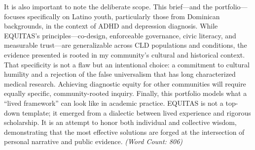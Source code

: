 \documentclass[11pt,twoside]{article}
\begin{document}
It is also important to note the deliberate scope. This brief—and the portfolio—focuses specifically on Latino youth, particularly those from Dominican backgrounds, in the context of ADHD and depression diagnosis. While EQUITAS’s principles—co-design, enforceable governance, civic literacy, and measurable trust—are generalizable across CLD populations and conditions, the evidence presented is rooted in my community’s cultural and historical context. That specificity is not a flaw but an intentional choice: a commitment to cultural humility and a rejection of the false universalism that has long characterized medical research. Achieving diagnostic equity for other communities will require equally specific, community-rooted inquiry. Finally, this portfolio models what a “lived framework” can look like in academic practice. EQUITAS is not a top-down template; it emerged from a dialectic between lived experience and rigorous scholarship. It is an attempt to honor both individual and collective wisdom, demonstrating that the most effective solutions are forged at the intersection of personal narrative and public evidence. \textit{(Word Count: 806)}
\end{document}
